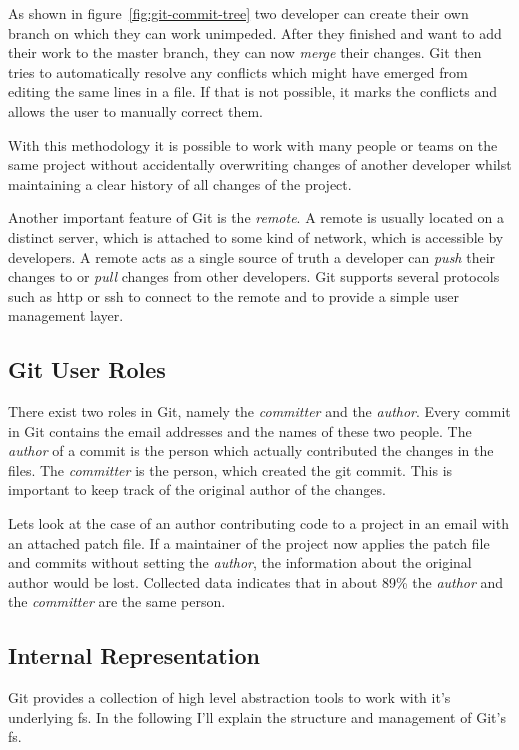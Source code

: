 As shown in figure~\ref{fig:git-commit-tree} two developer can create their own branch on which they can work unimpeded.
After they finished and want to add their work to the master branch, they can now \emph{merge} their changes.
Git then tries to automatically resolve any conflicts which might have emerged from editing the same lines in a file.
If that is not possible, it marks the conflicts and allows the user to manually correct them.


With this methodology it is possible to work with many people or teams on the same project without accidentally overwriting changes of another developer whilst maintaining a clear history of all changes of the project.

Another important feature of Git is the \emph{remote}.
A remote is usually located on a distinct server, which is attached to some kind of network, which is accessible by developers.
A remote acts as a single source of truth a developer can \emph{push} their changes to or \emph{pull} changes from other developers.
Git supports several protocols such as \ac{http} or \ac{ssh} to connect to the remote and to provide a simple user management layer.


\subsection{Git User Roles}
There exist two roles in Git, namely the \emph{committer} and the \emph{author}.
Every commit in Git contains the email addresses and the names of these two people.
The \emph{author} of a commit is the person which actually contributed the changes in the files.
The \emph{committer} is the person, which created the git commit.
This is important to keep track of the original author of the changes.

Lets look at the case of an author contributing code to a project in an email with an attached patch file.
If a maintainer of the project now applies the patch file and commits without setting the \emph{author}, the information about the original author would be lost.
Collected data indicates that in about 89\% the \emph{author} and the \emph{committer} are the same person.


\subsection{Internal Representation}
Git provides a collection of high level abstraction tools to work with it's underlying \ac{fs}.
In the following I'll explain the structure and management of Git's \ac{fs}.

